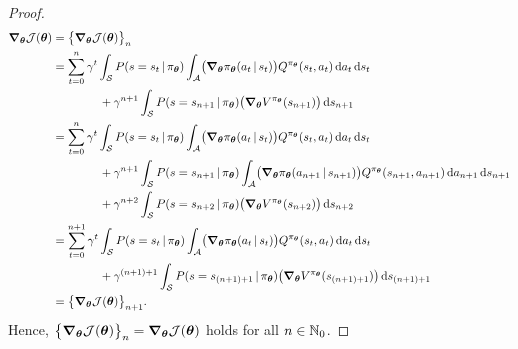 \begin{proof}
			\begin{align}
				\grad_{\bm{\theta}} \mathcal{J}(\bm{\theta})
					&= \bigl\{ \grad_{\bm{\theta}} \mathcal{J}(\bm{\theta}) \bigr\}_n \\
					&= \sum_{t = 0}^{n} \gamma^t \int_{\mathcal{S}} P(s = s_t \,\vert\, \pi_{\bm{\theta}}) \int_{\mathcal{A}} \bigl( \grad_{\bm{\theta}} \pi_{\bm{\theta}}(a_t \,\vert\, s_t) \bigr) Q^{\pi_{\bm{\theta}}}(s_t, a_t) \dd{a_t} \dd{s_t} \\&\qquad\qquad
						+ \gamma^{n + 1} \int_\mathcal{S} P(s = s_{n + 1} \,\vert\, \pi_{\bm{\theta}}) \bigl( \grad_{\bm{\theta}} V^{\pi_{\bm{\theta}}}(s_{n + 1}) \bigr) \dd{s_{n + 1}} \\
					&= \sum_{t = 0}^{n} \gamma^t \int_{\mathcal{S}} P(s = s_t \,\vert\, \pi_{\bm{\theta}}) \int_{\mathcal{A}} \bigl( \grad_{\bm{\theta}} \pi_{\bm{\theta}}(a_t \,\vert\, s_t) \bigr) Q^{\pi_{\bm{\theta}}}(s_t, a_t) \dd{a_t} \dd{s_t} \\&\qquad\qquad
						+ \gamma^{n + 1} \int_\mathcal{S} P(s = s_{n + 1} \,\vert\, \pi_{\bm{\theta}}) \int_\mathcal{A} \bigl( \grad_{\bm{\theta}} \pi_{\bm{\theta}}(a_{n + 1} \,\vert\, s_{n + 1}) \bigr) Q^{\pi_{\bm{\theta}}}(s_{n + 1}, a_{n + 1}) \dd{a_{n + 1}} \dd{s_{n + 1}} \\&\qquad\qquad
						+ \gamma^{n + 2} \int_\mathcal{S} P(s = s_{n + 2} \,\vert\, \pi_{\bm{\theta}}) \bigl( \grad_{\bm{\theta}} V^{\pi_{\bm{\theta}}}(s_{n + 2}) \bigr) \dd{s_{n + 2}} \\
					&= \sum_{t = 0}^{n + 1} \gamma^t \int_{\mathcal{S}} P(s = s_t \,\vert\, \pi_{\bm{\theta}}) \int_{\mathcal{A}} \bigl( \grad_{\bm{\theta}} \pi_{\bm{\theta}}(a_t \,\vert\, s_t) \bigr) Q^{\pi_{\bm{\theta}}}(s_t, a_t) \dd{a_t} \dd{s_t} \\&\qquad\qquad
						+ \gamma^{(n + 1) + 1} \int_\mathcal{S} P(s = s_{(n + 1) + 1} \,\vert\, \pi_{\bm{\theta}}) \bigl( \grad_{\bm{\theta}} V^{\pi_{\bm{\theta}}}(s_{(n + 1) + 1}) \bigr) \dd{s_{(n + 1) + 1}} \\
					&= \bigl\{ \grad_{\bm{\theta}} \mathcal{J}(\bm{\theta}) \bigr\}_{n + 1}.
			\end{align}
			Hence, \( \bigl\{ \grad_{\bm{\theta}} \mathcal{J}(\bm{\theta}) \bigr\}_n = \grad_{\bm{\theta}} \mathcal{J}(\bm{\theta}) \) holds for all \(n \in \mathbb{N}_0\).


\end{proof}
